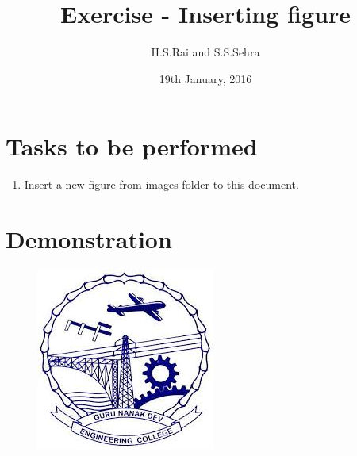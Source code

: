 \documentclass{article}
\title{Exercise - Inserting figure}
\author{H.S.Rai and S.S.Sehra}
\date{19th January, 2016}
\begin{document}
	\maketitle	
	\section*{Tasks to be performed}
	\begin{enumerate}	
		\item Insert a new figure from images folder to this document.
	\end{enumerate}
	\section*{Demonstration}
\begin{figure}[h]
\centering
\includegraphics[width=0.7\linewidth]{../../images/gnelogo}
\caption{}
\label{fig:gnelogo}
\end{figure}
\end{document}
